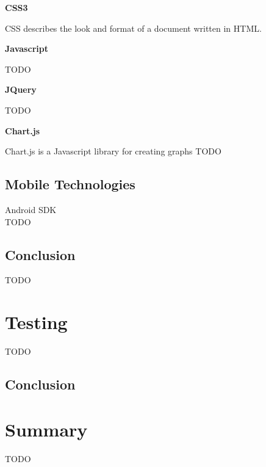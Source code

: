 \textbf{CSS3}

CSS describes the look and format of a document written in HTML.

\textbf{Javascript}

TODO

\textbf{JQuery}

TODO

\textbf{Chart.js}

Chart.js is a Javascript library for creating graphs TODO

\subsection{Mobile Technologies}

Android SDK \\
TODO

\subsection{Conclusion}

TODO


\section{Testing}

TODO

\subsection{Conclusion}


\section{Summary}

TODO
